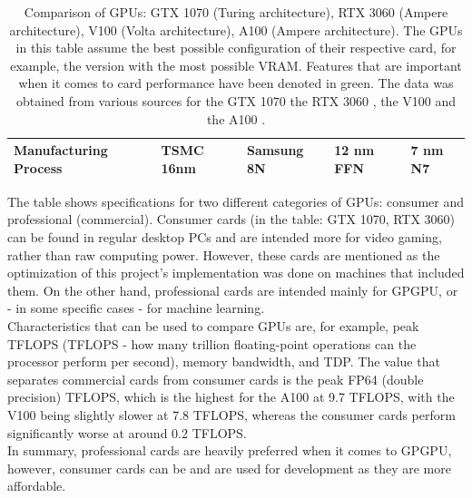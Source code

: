 \begin{table}[ht!]
\begin{tabular}{|>{\raggedright\arraybackslash\bfseries\scriptsize}m{2.7cm}|>{\scriptsize}m{2.7cm}|>{\scriptsize}m{2.7cm}|>{\scriptsize}m{2.7cm}|>{\scriptsize}m{2.7cm}|}
		\hline
		Manufacturing Process & TSMC 16nm & Samsung 8N & 12 nm FFN & 7 nm N7\\
		\hline
	\end{tabular}
	\caption{Comparison of GPUs: GTX 1070 (Turing architecture), RTX 3060 (Ampere architecture), V100 (Volta architecture), A100 (Ampere architecture). The GPUs in this table assume the best possible configuration of their respective card, for example, the version with the most possible VRAM. Features that are important when it comes to card performance have been denoted in green. The data was obtained from various sources for the GTX 1070 \cite{Hagedoorn6October2016, oaUUFoT7oI5ApIyY, Smith18May2016, jAnwkq6mMKYTLUOB} the RTX 3060 \cite{Walton7July2021, wGXr33zSUweXiQMY, SMhyh0H3oh3nlda0, May1December2020}, the V100 \cite{NvidiaAugust2017} and the A100 \cite{soj8qSRbfefUdi8Y, rfiOEXAGDlcAOxF3}.}
	\label{Table:theory-GPUs-GPGPU-nvidia-gpu-details-comparison}
\end{table}

The table shows specifications for two different categories of GPUs: consumer and professional (commercial). Consumer cards (in the table: GTX 1070, RTX 3060) can be found in regular desktop PCs and are intended more for video gaming, rather than raw computing power. However, these cards are mentioned as the optimization of this project's implementation was done on machines that included them. On the other hand, professional cards are intended mainly for GPGPU, or - in some specific cases - for machine learning. \\
Characteristics that can be used to compare GPUs are, for example, peak TFLOPS (TFLOPS - how many trillion floating-point operations can the processor perform per second), memory bandwidth, and TDP. The value that separates commercial cards from consumer cards is the peak FP64 (double precision) TFLOPS, which is the highest for the A100 at 9.7 TFLOPS, with the V100 being slightly slower at 7.8 TFLOPS, whereas the consumer cards perform significantly worse at around 0.2 TFLOPS. \\
In summary, professional cards are heavily preferred when it comes to GPGPU, however, consumer cards can be and are used for development as they are more affordable.



